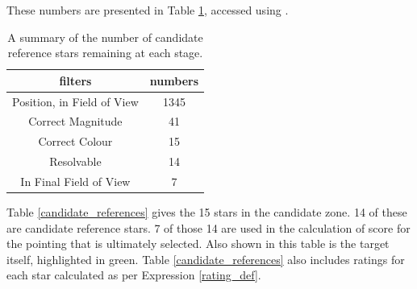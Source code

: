 \documentclass{aa}
\begin{document}
These numbers are presented in Table \ref{summary_of_references}, accessed using \citet{rcurl}. 

\begin{table}[!htb]
\centering
\begin{tabular}{cc}
\hline\hline
filters & numbers\\
\hline
Position, in Field of View & 1345\\
Correct Magnitude & 41\\
Correct Colour & 15\\
Resolvable & 14\\
In Final Field of View & 7\\
\hline
\end{tabular}
\caption{\label{summary_of_references}A summary of the number of candidate reference stars remaining at each stage.}
\end{table}


Table \ref{candidate_references} gives the 15 stars in the candidate zone.  14 of these are candidate reference stars.  7 of those 14 are used in the calculation of score for the pointing that is ultimately selected.  Also shown in this table is the target itself, highlighted in green. Table \ref{candidate_references} also includes ratings for each star calculated as per Expression \ref{rating_def}.
\end{document}
